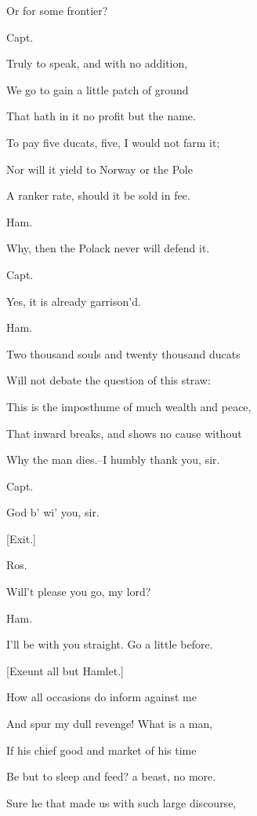\documentclass[12pt]{book}
\begin{document}
Or for some frontier?



Capt.

Truly to speak, and with no addition,

We go to gain a little patch of ground

That hath in it no profit but the name.

To pay five ducats, five, I would not farm it;

Nor will it yield to Norway or the Pole

A ranker rate, should it be sold in fee.



Ham.

Why, then the Polack never will defend it.



Capt.

Yes, it is already garrison'd.



Ham.

Two thousand souls and twenty thousand ducats

Will not debate the question of this straw:

This is the imposthume of much wealth and peace,

That inward breaks, and shows no cause without

Why the man dies.--I humbly thank you, sir.



Capt.

God b' wi' you, sir.



[Exit.]



Ros.

Will't please you go, my lord?



Ham.

I'll be with you straight. Go a little before.



[Exeunt all but Hamlet.]



How all occasions do inform against me

And spur my dull revenge! What is a man,

If his chief good and market of his time

Be but to sleep and feed? a beast, no more.

Sure he that made us with such large discourse,
\end{document}
